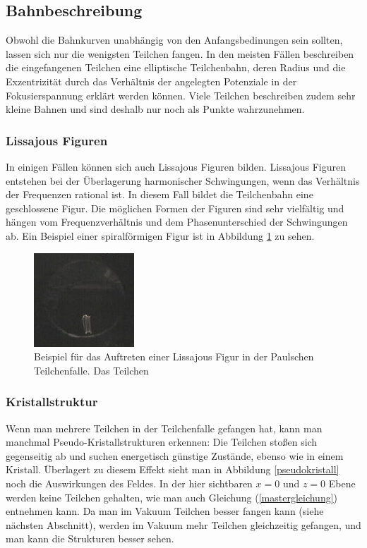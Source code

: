 \documentclass[a4paper,12pt]{article}
\begin{document}
\subsection{Bahnbeschreibung}
Obwohl die Bahnkurven unabhängig von den Anfangsbedinungen sein sollten, lassen sich nur die wenigsten Teilchen fangen.
In den meisten Fällen beschreiben die eingefangenen Teilchen eine elliptische Teilchenbahn, deren Radius und die Exzentrizität durch das Verhältnis der angelegten Potenziale 
in der Fokusierspannung erklärt werden können.
Viele Teilchen beschreiben zudem sehr kleine Bahnen und sind deshalb nur noch als Punkte wahrzunehmen.

\subsubsection*{Lissajous Figuren}
In einigen Fällen können sich auch Lissajous Figuren bilden. Lissajous Figuren entstehen bei der Überlagerung harmonischer Schwingungen, wenn das Verhältnis der Frequenzen rational ist.
In diesem Fall bildet die Teilchenbahn eine geschlossene Figur.
Die möglichen Formen der Figuren sind sehr vielfältig und hängen vom Frequenzverhältnis und dem Phasenunterschied der Schwingungen ab.
Ein Beispiel einer spiralförmigen Figur ist in Abbildung \ref{Lissjous} zu sehen.

\begin{figure}[htb]
		\centering
		\includegraphics{lisa_klein.jpg}
		\caption{Beispiel für das Auftreten einer Lissajous Figur in der Paulschen Teilchenfalle.
		Das Teilchen }
		\label{Lissjous}
\end{figure}

\subsubsection*{Kristallstruktur}
Wenn man mehrere Teilchen in der Teilchenfalle gefangen hat, kann man manchmal Pseudo-Kristallstrukturen erkennen:
Die Teilchen stoßen sich gegenseitig ab und suchen energetisch günstige Zustände, ebenso wie in einem Kristall.
Überlagert zu diesem Effekt sieht man in Abbildung \ref{pseudokristall} noch die Auswirkungen des Feldes.
In der hier sichtbaren $x = 0$ und $z = 0$  Ebene werden keine Teilchen gehalten, wie man auch Gleichung (\ref{mastergleichung}) entnehmen kann.
Da man im Vakuum Teilchen besser fangen kann (siehe nächsten Abschnitt), werden im Vakuum mehr Teilchen gleichzeitig gefangen, und man kann die Strukturen besser sehen.
\end{document}
